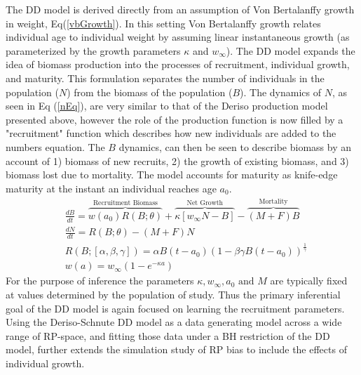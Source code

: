 \documentclass[12pt]{article}
\begin{document}
%
The DD model is derived directly from an assumption of Von Bertalanffy growth  %
in weight, Eq(\ref{vbGrowth}). In this setting Von Bertalanffy 
growth relates individual age to individual weight by assuming linear 
instantaneous growth (as parameterized by the growth parameters $\kappa$ and 
$w_\infty$). The DD model expands the idea of biomass production into the 
processes of recruitment, individual growth, and maturity. This formulation 
separates the number of individuals in the population ($N$) from the biomass 
of the population ($B$). The dynamics of $N$, as seen in Eq (\ref{nEq}), are 
very similar to that of the Deriso production model presented above, however 
the role of the production function is now filled by a "recruitment" function 
which describes how new individuals are added to the numbers equation. The $B$ dynamics, 
can then be seen to describe biomass by an account of 1) biomass of new 
recruits, 2) the growth of existing biomass, and 3) biomass lost due to 
mortality. The model accounts for maturity as knife-edge maturity at the 
instant an individual reaches age $a_0$.  
%
\begin{align}
&\frac{dB}{dt} = \overbrace{w(a_0)R(B;\theta)}^\text{Recruitment Biomass} + \overbrace{\kappa \left[w_\infty N-B\right]}^\text{Net Growth} - \overbrace{(M+F)B}^\text{Mortality} \label{bEq}\\
&\frac{dN}{dt} = R(B;\theta) - (M+F)N \label{nEq}\\
&R(B;[\alpha, \beta, \gamma]) = \alpha B(t-a_0)(1-\beta\gamma B(t-a_0))^{\frac{1}{\gamma}} \label{srr}\\
&w(a) = w_\infty(1-e^{-\kappa a}) \label{vbGrowth}
\end{align}
%
\indent
For the purpose of inference the parameters $\kappa, w_\infty, a_0 \text{ and } M$ are 
typically fixed at values determined by the population of study. Thus the 
primary inferential goal of the DD model is again focused on learning the 
recruitment parameters. Using the Deriso-Schnute DD model as a data generating 
model across a wide range of RP-space, and fitting those data under a BH 
restriction of the DD model, further extends the simulation study of RP bias 
to include the effects of individual growth.
\end{document}
